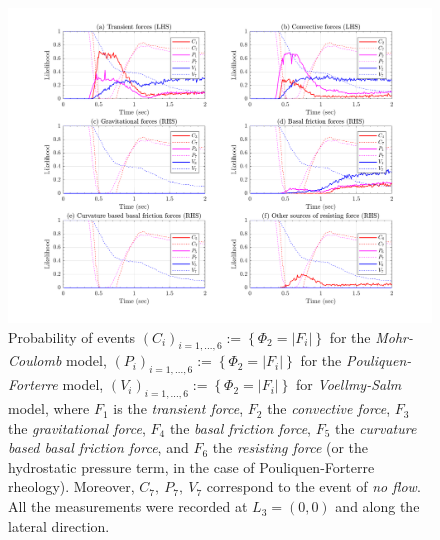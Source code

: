 \documentclass{article}
\begin{document}
\begin{figure}[H]
        \centering
        \includegraphics[width=1\textwidth]{InclinedPlane/LocalRecords/DominancePrY_L3.png}
        \caption{Probability of events $(C_i)_{i=1,...,6}:=\left\{\Phi_2=|F_i|\right\}$ for the \emph{Mohr-Coulomb} model, $(P_i)_{i=1,...,6}:=\left\{\Phi_2=|F_i|\right\}$ for the \emph{Pouliquen-Forterre} model, $(V_i)_{i=1,...,6}:=\left\{\Phi_2=|F_i|\right\}$ for \emph{Voellmy-Salm} model, where $F_1$ is the \emph{transient force}, $F_2$ the \emph{convective force}, $F_3$ the \emph{gravitational force}, $F_4$ the \emph{basal friction force}, $F_5$ the \emph{curvature based basal friction force}, and $F_6$ the \emph{resisting force} (or the hydrostatic pressure term, in the case of Pouliquen-Forterre rheology). Moreover, $C_7,\ P_7,\ V_7$ correspond to the event of \emph{no flow}. All the measurements were recorded at $L_3=(0,0)$ and along the lateral direction.}
        \label{fig:Ramp-FXDominance-L3}
\end{figure}
\end{document}
